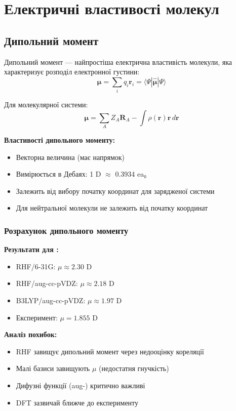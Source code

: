 \section{Електричні властивості молекул}\label{sec:elprop}

\subsection{Дипольний момент}

Дипольний момент --- найпростіша електрична властивість молекули,
яка характеризує розподіл електронної густини:
\[
\boldsymbol{\mu} = \sum_i q_i \mathbf{r}_i =
\langle\Psi|\hat{\boldsymbol{\mu}}|\Psi\rangle
\]

Для молекулярної системи:
\[
\boldsymbol{\mu} = \sum_A Z_A \mathbf{R}_A -
\int \rho(\mathbf{r}) \mathbf{r} \, d\mathbf{r}
\]

\textbf{Властивості дипольного моменту:}
\begin{itemize}
    \item Векторна величина (має напрямок)
    \item Вимірюється в Дебаях: 1 D $\approx$ 0.3934 ea₀
    \item Залежить від вибору початку координат для зарядженої системи
    \item Для нейтральної молекули не залежить від початку координат
\end{itemize}

\subsubsection{Розрахунок дипольного моменту}


\textbf{Результати для :}
\begin{itemize}
    \item RHF/6-31G: $\mu \approx 2.30$ D
    \item RHF/aug-cc-pVDZ: $\mu \approx 2.18$ D
    \item B3LYP/aug-cc-pVDZ: $\mu \approx 1.97$ D
    \item Експеримент: $\mu = 1.855$ D
\end{itemize}

\textbf{Аналіз похибок:}
\begin{itemize}
    \item RHF завищує дипольний момент через недооцінку кореляції
    \item Малі базиси завищують $\mu$ (недостатня гнучкість)
    \item Дифузні функції (aug-) критично важливі
    \item DFT зазвичай ближче до експерименту
\end{itemize}

